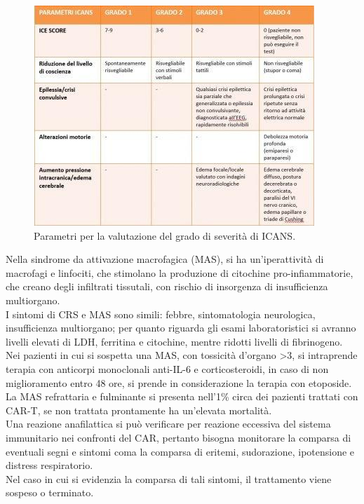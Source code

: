 \begin{figure}[H]
    \begin{center}
    \includegraphics[width=0.7\columnwidth]{img/ICANS .jpeg}
    \end{center}
    \caption[Parametri per la valutazione del grado di severità di ICANS.]{Parametri per la valutazione del grado di severità di ICANS.
    \cite{img27}}

\end{figure}

Nella sindrome da attivazione macrofagica (MAS), si ha un’iperattività di macrofagi e linfociti, che stimolano la 
produzione di citochine pro-infiammatorie, che creano degli infiltrati tissutali, con rischio di insorgenza di 
insufficienza multiorgano.\\
I sintomi di CRS e MAS sono simili: febbre, sintomatologia neurologica, insufficienza multiorgano; 
per quanto riguarda gli esami laboratoristici si avranno livelli elevati di LDH, ferritina e citochine, mentre 
ridotti livelli di fibrinogeno\cite{EMATOCART}.
Nei pazienti in cui si sospetta una MAS, con tossicità d’organo >3, si intraprende terapia con anticorpi monoclonali 
anti-IL-6 e corticosteroidi, in caso di non miglioramento entro 48 ore, 
si prende in considerazione la terapia con etoposide.\\
La MAS refrattaria e fulminante si presenta nell’1\% circa dei pazienti trattati con CAR-T, 
se non trattata prontamente ha un’elevata mortalità\cite{EMATOCART}.\\

Una reazione anafilattica si può verificare per reazione eccessiva del sistema immunitario nei confronti del CAR, 
pertanto bisogna monitorare la comparsa di eventuali segni e sintomi coma la comparsa di eritemi, 
sudorazione, ipotensione e distress respiratorio\cite{EMATOCART}.\\
Nel caso in cui si evidenzia la comparsa di tali sintomi, il trattamento viene sospeso o terminato\cite{Frontiers}.\\

